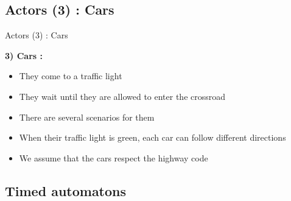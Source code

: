 \documentclass{bredelebeamer}
\begin{document}
\subsection{Actors (3) : Cars }

\begin{frame}{Actors (3) : Cars }


\textbf{3) Cars : }


\begin{itemize}

\item They come to a traffic light

\item They wait until they are allowed to enter the crossroad

\item There are several scenarios for them

\item When their traffic light is green, each car can follow different directions

\item We assume that the cars respect the highway code

\end{itemize}


\end{frame}


\subsection{Timed automatons}
\end{document}
